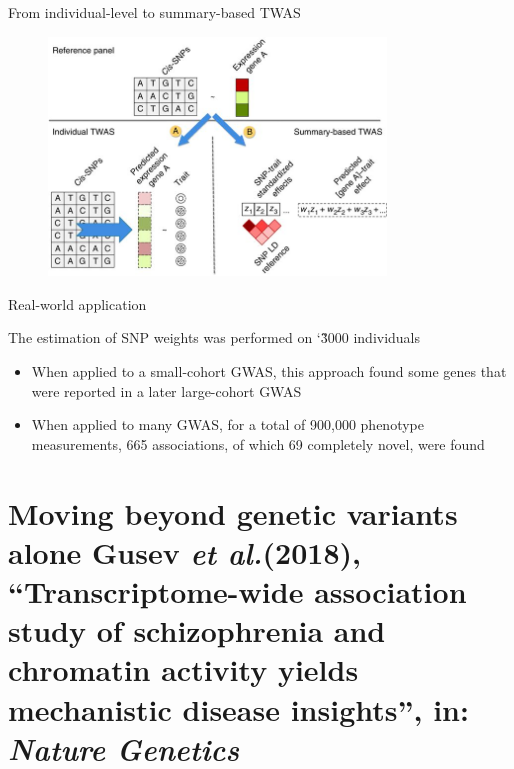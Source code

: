 \documentclass[aspectratio=169,12pt]{beamer}
\newcommand{\etal}{\textit{et al.}\xspace}
\begin{document}
\begin{frame}{From individual-level to summary-based TWAS}

	\begin{figure}
		\includegraphics[width=0.8\textwidth]{gusev2016/1-TWAS_schematic}
	\end{figure}


\end{frame}

\begin{frame}{Real-world application}

	The estimation of SNP weights was performed on \char`\~3000 
individuals

	\begin{itemize}
		\item When applied to a small-cohort GWAS, this approach found 
some genes that were reported in a later large-cohort GWAS
		\item When applied to many GWAS, for a total of 900,000 
phenotype measurements, 665 associations, of which 69 completely novel, 
were found
	\end{itemize}


\end{frame}

\section{Moving beyond genetic variants alone \newline
	\scriptsize Gusev \etal (2018), \enquote{Transcriptome-wide 
association study of schizophrenia and chromatin activity yields 
mechanistic disease insights}, in: \textit{Nature Genetics}}
\end{document}
